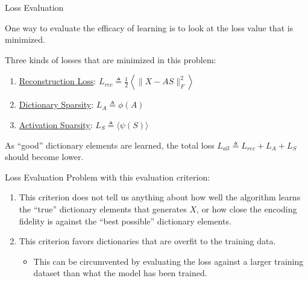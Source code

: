 \documentclass{beamer}
\begin{document}
\begin{frame}{Loss Evaluation}

One way to evaluate the efficacy of learning is to look at the loss value that is minimized.

Three kinds of losses that are minimized in this problem:

\begin{enumerate}
	\item \underline{Reconstruction Loss}: $L_{rec} \triangleq \frac{1}{2} \left\langle\| X - A S \|_F^2\right \rangle$
	\item \underline{Dictionary Sparsity}: $L_{A} \triangleq  \phi(A)$
	\item \underline{Activation Sparsity}: $L_{S} \triangleq  \langle \psi(S) \rangle $
\end{enumerate}

\begin{beamerboxesrounded}[lower=lowyellow,upper=upyellow,shadow=true]{}
As ``good'' dictionary elements are learned, the total loss $L_{all} \triangleq L_{rec} + L_A + L_S$ should become lower.
\end{beamerboxesrounded}

\end{frame}

\begin{frame}{Loss Evaluation}
Problem with this evaluation criterion:

\begin{enumerate}
	\item This criterion does not tell us anything about how well the algorithm learns the ``true'' dictionary elements that generates $X$, or how close the encoding fidelity is against the ``best possible'' dictionary elements.

	\item This criterion favors dictionaries that are overfit to the training data.

\begin{itemize}
	\item This can be circumvented by evaluating the loss against a larger training dataset than what the model has been trained.
\end{itemize}
\end{enumerate}

\end{frame}
\end{document}
